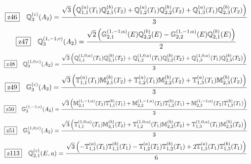 \documentclass[fleqn,10pt,landscape]{jsarticle}
\begin{document}
\begin{dmath*}
\hspace*{3mm}\fbox{z46}\quad \mathbb{Q}_{3}^{(c)}(A_{2})=\frac{\sqrt{3} \left(\mathbb{Q}_{1,1}^{(a)}(T_{1}) \mathbb{Q}_{2,1}^{(b)}(T_{2}) + \mathbb{Q}_{1,2}^{(a)}(T_{1}) \mathbb{Q}_{2,2}^{(b)}(T_{2}) + \mathbb{Q}_{1,3}^{(a)}(T_{1}) \mathbb{Q}_{2,3}^{(b)}(T_{2})\right)}{3}
\end{dmath*}
\begin{dmath*}
\hspace*{3mm}\fbox{z47}\quad \mathbb{Q}_{3}^{(1,-1;c)}(A_{2})=\frac{\sqrt{2} \left(\mathbb{G}_{2,1}^{(1,-1;a)}(E) \mathbb{Q}_{2,2}^{(b)}(E) - \mathbb{G}_{2,2}^{(1,-1;a)}(E) \mathbb{Q}_{2,1}^{(b)}(E)\right)}{2}
\end{dmath*}
\begin{dmath*}
\hspace*{3mm}\fbox{z48}\quad \mathbb{Q}_{3}^{(1,0;c)}(A_{2})=\frac{\sqrt{3} \left(\mathbb{Q}_{1,1}^{(1,0;a)}(T_{1}) \mathbb{Q}_{2,1}^{(b)}(T_{2}) + \mathbb{Q}_{1,2}^{(1,0;a)}(T_{1}) \mathbb{Q}_{2,2}^{(b)}(T_{2}) + \mathbb{Q}_{1,3}^{(1,0;a)}(T_{1}) \mathbb{Q}_{2,3}^{(b)}(T_{2})\right)}{3}
\end{dmath*}
\begin{dmath*}
\hspace*{3mm}\fbox{z49}\quad \mathbb{G}_{3}^{(c)}(A_{2})=\frac{\sqrt{3} \left(\mathbb{T}_{1,1}^{(a)}(T_{1}) \mathbb{M}_{2,1}^{(b)}(T_{2}) + \mathbb{T}_{1,2}^{(a)}(T_{1}) \mathbb{M}_{2,2}^{(b)}(T_{2}) + \mathbb{T}_{1,3}^{(a)}(T_{1}) \mathbb{M}_{2,3}^{(b)}(T_{2})\right)}{3}
\end{dmath*}
\begin{dmath*}
\hspace*{3mm}\fbox{z50}\quad \mathbb{G}_{3}^{(1,-1;c)}(A_{2})=\frac{\sqrt{3} \left(\mathbb{M}_{2,1}^{(1,-1;a)}(T_{2}) \mathbb{T}_{1,1}^{(b)}(T_{1}) + \mathbb{M}_{2,2}^{(1,-1;a)}(T_{2}) \mathbb{T}_{1,2}^{(b)}(T_{1}) + \mathbb{M}_{2,3}^{(1,-1;a)}(T_{2}) \mathbb{T}_{1,3}^{(b)}(T_{1})\right)}{3}
\end{dmath*}
\begin{dmath*}
\hspace*{3mm}\fbox{z51}\quad \mathbb{G}_{3}^{(1,0;c)}(A_{2})=\frac{\sqrt{3} \left(\mathbb{T}_{1,1}^{(1,0;a)}(T_{1}) \mathbb{M}_{2,1}^{(b)}(T_{2}) + \mathbb{T}_{1,2}^{(1,0;a)}(T_{1}) \mathbb{M}_{2,2}^{(b)}(T_{2}) + \mathbb{T}_{1,3}^{(1,0;a)}(T_{1}) \mathbb{M}_{2,3}^{(b)}(T_{2})\right)}{3}
\end{dmath*}
\begin{dmath*}
\hspace*{3mm}\fbox{z113}\quad \mathbb{Q}_{2,1}^{(c)}(E,a)=\frac{\sqrt{3} \left(- \mathbb{T}_{1,1}^{(a)}(T_{1}) \mathbb{T}_{1,1}^{(b)}(T_{1}) - \mathbb{T}_{1,2}^{(a)}(T_{1}) \mathbb{T}_{1,2}^{(b)}(T_{1}) + 2 \mathbb{T}_{1,3}^{(a)}(T_{1}) \mathbb{T}_{1,3}^{(b)}(T_{1})\right)}{6}
\end{dmath*}
\end{document}
